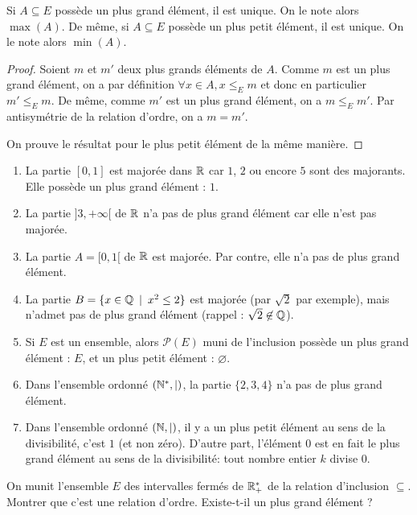 \begin{proposition}
Si $A\subseteq E$ possède un plus grand élément, il est unique. On le note alors $\max(A)$.
De même, si $A\subseteq E$ possède un plus petit élément, il est unique. On le note alors $\min(A)$.
\end{proposition}
\begin{proof}
Soient $m$ et $m'$ deux plus grands éléments de $A$. Comme $m$ est un plus grand élément, on a par définition $\forall x\in A, x\leq_E m$ et donc en particulier $m'\leq_E m$. De même, comme $m'$ est un plus grand élément, on a $m\leq_E m'$. Par antisymétrie de la relation d'ordre, on a $m=m'$.

On prouve le résultat pour le plus petit élément de la même manière.
\end{proof}

\begin{exemples}
\begin{enumerate}[label=\alph*)]
\item  La partie $[0,1]$ est majorée dans $\mathbb{R}$ car $1$, $2$ ou encore $5$ sont des majorants. Elle possède un plus grand élément : $1$.
\item La partie $]3,+\infty[$ de $\mathbb{R}$ n'a pas de plus grand élément car elle n'est pas majorée.
\item La partie $A=[0,1[$ de $\mathbb{R}$ est majorée. Par contre, elle n'a pas de plus grand élément. 
\item La partie $B=\{x\in \Q\:\mid\: x^2\leq 2\}$ est majorée (par $\sqrt2$ par exemple), mais n'admet pas de plus grand élément (rappel : $\sqrt 2 \not\in\mathbb{Q}$).
\item Si $E$ est un ensemble, alors $\mathcal P(E)$ muni de l'inclusion possède un plus grand élément : $E$, et un plus petit élément : $\varnothing$.
\item Dans l'ensemble ordonné $(\mathbb{N}^*,|)$, la partie $\{2,3,4\}$ n'a pas de plus grand élément.
\item Dans l'ensemble ordonné $(\mathbb{N},|)$, il y a un plus petit élément au sens de la divisibilité, c'est $1$ (et non zéro). D'autre part, l'élément $0$ est en fait le plus grand élément au sens de la divisibilité: tout nombre entier $k$ divise $0$.
\end{enumerate}
\end{exemples}

\begin{exercice}
On munit l'ensemble $E$ des intervalles fermés de $\mathbb{R}_+^*$ de la relation d'inclusion $\subseteq$. Montrer que c'est une relation d'ordre. Existe-t-il un plus grand élément ?
\end{exercice}

